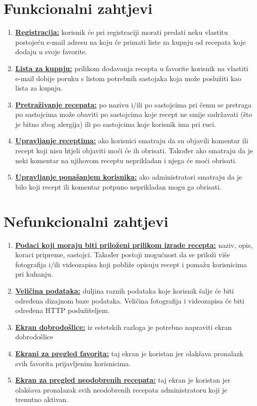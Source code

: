 \documentclass[times, utf8, zavrsni]{fer}
\begin{document}
\section{Funkcionalni zahtjevi}
\begin{enumerate}
      \item \textbf{\underline{Registracija:}} korisnik će pri registraciji morati predati neku vlastitu
            postojeću e-mail adresu na koju će primati liste za kupnju od recepata koje dodaju u svoje favorite.
      \item \textbf{\underline{Lista za kupnju:}} prilikom dodavanja recepta u favorite
            korisnik na vlastiti e-mail dobije poruku s listom potrebnih sastojaka koja
            može poslužiti kao lista za kupnju.
      \item \textbf{\underline{Pretraživanje recepata:}} po nazivu i/ili po sastojcima pri čemu se pretraga po
            sastojcima može obaviti po sastojcima koje recept ne smije sadržavati (što je bitno zbog
            alergija) ili po sastojcima koje korisnik ima pri ruci.
      \item \textbf{\underline{Upravljanje receptima:}} ako korisnici smatraju da su objavili komentar ili recept
            koji nisu htjeli objaviti moći će ih obrisati. Također ako smatraju da je neki komentar na njihovom receptu
            neprikladan i njega će moći obrisati.
      \item \textbf{\underline{Upravljanje ponašanjem korisnika:}} ako administratori smatraju da je bilo koji
            recept ili komentar potpuno neprikladan mogu ga obrisati.
\end{enumerate}

\section{Nefunkcionalni zahtjevi}
\begin{enumerate}
      \item \textbf{\underline{Podaci koji moraju biti priloženi prilikom izrade recepta:}} naziv, opis, koraci pripreme,
            sastojci. Također postoji mogućnost da se priloži više fotografija
            i/ili videozapisa koji pobliže opisuju recept i pomažu korisnicima pri kuhanju.
      \item \textbf{\underline{Veličina podataka:}} duljina raznih podataka koje korisnik šalje će biti
            određena dizajnom baze podataka. Veličina fotografija i videozapisa će biti određena
            HTTP poslužiteljem.
      \item \textbf{\underline{Ekran dobrodošlice:}} iz estetskih razloga je potrebno napraviti
            ekran dobrodošlice
      \item \textbf{\underline{Ekrani za pregled favorita:}} taj ekran
            je koristan jer olakšava pronalazk svih favorita prijavljenim korisnicima.
      \item \textbf{\underline{Ekran za pregled neodobrenih recepata:}} taj ekran
            je koristan jer olakšava pronalazak svih neodobrenih recepata administratoru koji je trenutno aktivan.
\end{enumerate}
\end{document}
